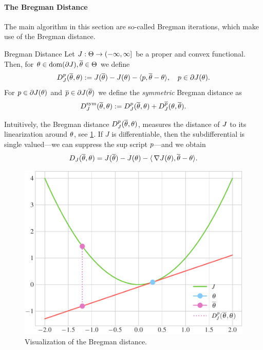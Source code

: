\paragraph{The Bregman Distance} The main algorithm in this section are so-called Bregman iterations, which make use of the Bregman distance.
%
\begin{definition}{Bregman Distance}{}
Let $J:\Theta\to(-\infty,\infty]$ be a proper and convex functional. Then, for $\theta\in\operatorname{dom}(\partial J),\overline{\theta}\in\Theta$ we define
\begin{align}\label{eq:bregman_distance}
D^p_J(\overline{\theta},\theta) := J(\overline {\theta})-J({\theta})-\langle p,\overline{\theta}-{\theta}\rangle,\quad p\in\partial J(\theta).
\end{align}
%
\noindent%
For $p\in\partial J({\theta})$ and $\overline{p}\in\partial J(\overline{\theta})$ we define the \emph{symmetric} Bregman distance as
\begin{align}
D^\mathrm{sym}_J(\overline{\theta},\theta) := D^p_J(\overline{\theta},\theta) + D^{\overline{p}}_J(\theta,\overline{\theta}).
\end{align}
\end{definition}
Intuitively, the Bregman distance $D^p_J(\overline{\theta},\theta)$, measures the distance of $J$ to its linearization around $\theta$, see \cref{fig:Bregdist}. If $J$ is differentiable, then the subdifferential is single valued---we can suppress the sup script $p$---and we obtain
%
\begin{align*}
D_J(\overline{\theta},\theta) = J(\overline {\theta})-J({\theta})-\langle\,\nabla J(\theta), \overline{\theta}-{\theta}\rangle.
\end{align*}
%
\begin{figure}
\centering
\includegraphics[width=.7\textwidth]{code/Bregman/lin_dist.pdf}
\caption{Visualization of the Bregman distance.}\label{fig:Bregdist}
\end{figure}
